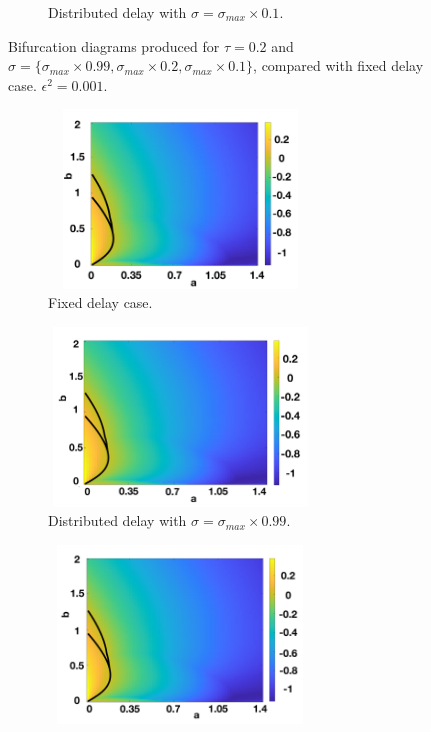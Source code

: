 \begin{figure}[H]
\begin{subfigure}[b]{0.45\textwidth}
        \caption{Distributed delay with $\sigma=\sigma_{max}\times0.1$.}
        \label{}
    \end{subfigure}
    \caption{Bifurcation diagrams produced for $\tau=0.2$ and $\sigma=\{ \sigma_{max}\times0.99,\sigma_{max}\times0.2,\sigma_{max}\times0.1 \}$, compared with fixed delay case. $\epsilon^2=0.001$. }
    \label{fig:distbif1}
\end{figure}
\begin{figure}[H]
    \centering
    \begin{subfigure}[b]{0.45\textwidth}
        \centering
        \includegraphics[width=7cm,height=4.75cm]{distbif31.png}
        \caption{Fixed delay case.}
        \label{}
    \end{subfigure}
    \hfill
    \begin{subfigure}[b]{0.45\textwidth}
        \centering
        \includegraphics[width=7cm,height=4.75cm]{distbif32.png}
        \caption{Distributed delay with $\sigma=\sigma_{max}\times0.99$.}
        \label{}
    \end{subfigure}
    \hfill
    \begin{subfigure}[b]{0.45\textwidth}
        \centering
        \includegraphics[width=7cm,height=4.75cm]{distbif33.png}

\end{subfigure}
\end{figure}
